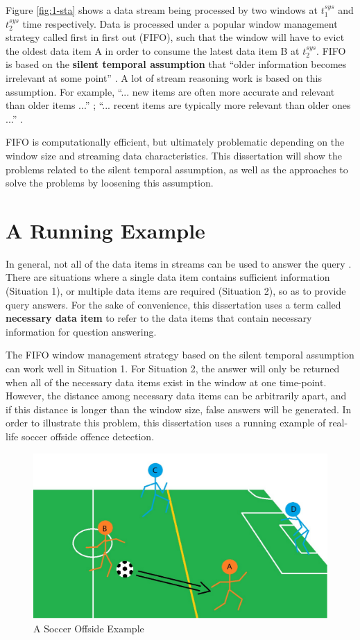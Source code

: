 Figure \ref{fig:1-sta} shows a data stream being processed by two windows at $t^{sys}_1$ and $t^{sys}_2$ time respectively. 
Data is processed under a popular window management strategy called first in first out (FIFO), such that the window will have to evict the oldest data item A in order to consume the latest data item B at $t^{sys}_{2}$.
FIFO is based on the \textbf{silent temporal assumption} that ``older information becomes irrelevant at some point'' \cite{barbieri2010stream} \cite{stuckenschmidt2010towards}.
A lot of stream reasoning work is based on this assumption.
For example, 
``... new items are often more accurate and relevant than older items ...'' \cite{golab2003processing};
``... recent items are typically more relevant than older ones ...'' \cite{barbieri2010deductive}.

FIFO is computationally efficient, but ultimately problematic depending on the window size and streaming data characteristics. 
This dissertation will show the problems related to the silent temporal assumption, as well as the approaches to solve the problems by loosening this assumption. 
%
\section{A Running Example}
In general, not all of the data items in streams can be used to answer the query \cite{mileo2013streamrule}.
There are situations where a single data item contains sufficient information (Situation 1), or multiple data items are required (Situation 2), so as to provide query answers. 
For the sake of convenience, this dissertation uses a term called \textbf{necessary data item} to refer to the data items that contain necessary information for question answering. 

The FIFO window management strategy based on the silent temporal assumption can work well in Situation 1. 
For Situation 2, the answer will only be returned when all of the necessary data items exist in the window at one time-point. 
However, the distance among necessary data items can be arbitrarily apart, and if this distance is longer than the window size, false answers will be generated. 
In order to illustrate this problem, this dissertation uses a running example of real-life soccer offside offence detection.

\begin{figure}[!htbp]
	\centering
	\includegraphics[width=5in]{img/1-soe.pdf}
	\caption{A Soccer Offside Example}
	\label{fig:1-soe} 
\end{figure}

